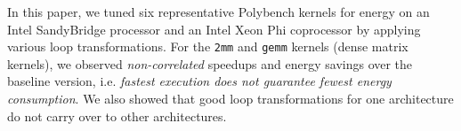 In this paper, we tuned six representative Polybench kernels for energy on
an Intel SandyBridge processor and an Intel Xeon Phi coprocessor by applying various loop 
transformations. For the \texttt{2mm} and \texttt{gemm} kernels (dense matrix kernels),
we observed \emph{non-correlated} speedups and energy savings over the baseline version,
i.e. \emph{fastest execution does not guarantee fewest energy consumption}. 
We also showed that good loop transformations for one architecture do not carry over to
other architectures.
